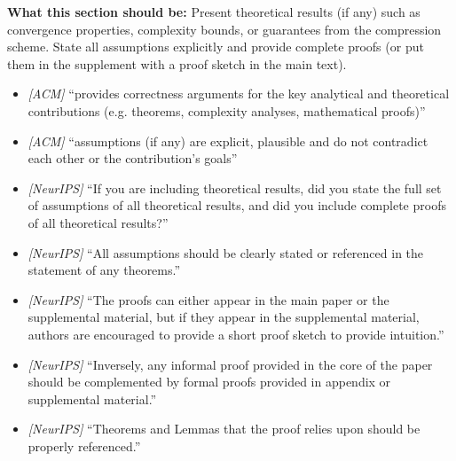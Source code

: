 \noindent\textbf{What this section should be:}
Present theoretical results (if any) such as convergence properties, complexity bounds, or guarantees from the compression scheme. State all assumptions explicitly and provide complete proofs (or put them in the supplement with a proof sketch in the main text).
\begin{itemize}
  \item \textit{[ACM]} ``provides correctness arguments for the key analytical and theoretical contributions (e.g. theorems, complexity analyses, mathematical proofs)''
  \item \textit{[ACM]} ``assumptions (if any) are explicit, plausible and do not contradict each other or the contribution's goals''
  \item \textit{[NeurIPS]} ``If you are including theoretical results, did you state the full set of assumptions of all theoretical results, and did you include complete proofs of all theoretical results?''
  \item \textit{[NeurIPS]} ``All assumptions should be clearly stated or referenced in the statement of any theorems.''
  \item \textit{[NeurIPS]} ``The proofs can either appear in the main paper or the supplemental material, but if they appear in the supplemental material, authors are encouraged to provide a short proof sketch to provide intuition.''
  \item \textit{[NeurIPS]} ``Inversely, any informal proof provided in the core of the paper should be complemented by formal proofs provided in appendix or supplemental material.''
  \item \textit{[NeurIPS]} ``Theorems and Lemmas that the proof relies upon should be properly referenced.''
\end{itemize}
